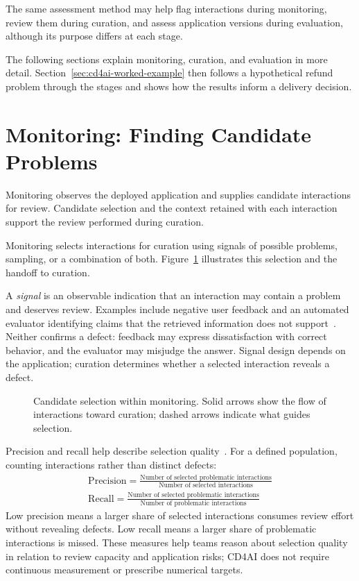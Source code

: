 The same assessment method may help flag interactions during monitoring, review
them during curation, and assess application versions during evaluation,
although its purpose differs at each stage.

The following sections explain monitoring, curation, and evaluation in more
detail. Section~\ref{sec:cd4ai-worked-example} then follows a hypothetical
refund problem through the stages and shows how the results inform a delivery
decision.

\section{Monitoring: Finding Candidate Problems}
\label{sec:cd4ai-monitoring}

Monitoring observes the deployed application and supplies candidate interactions
for review. Candidate selection and the context retained with each interaction
support the review performed during curation.

Monitoring selects interactions for curation using signals of possible
problems, sampling, or a combination of both. Figure~\ref{fig:cd4ai-candidate-selection}
illustrates this selection and the handoff to curation.

A \emph{signal} is an observable indication that an interaction may contain a
problem and deserves review. Examples include negative user feedback and an
automated evaluator identifying claims that the retrieved information does not
support~\parencite{MLflow:RetrievalGroundedness}. Neither confirms a defect:
feedback may express dissatisfaction with correct behavior, and the evaluator
may misjudge the answer. Signal design depends on the application; curation
determines whether a selected interaction reveals a defect.

\begin{figure}[htbp]
  \centering
  
  \caption{Candidate selection within monitoring. Solid arrows show the flow
    of interactions toward curation; dashed arrows indicate what guides
    selection.}
  \label{fig:cd4ai-candidate-selection}
\end{figure}

Precision and recall help describe selection
quality~\parencite[Section~8.3]{Manning:IR:2008}. For a defined population,
counting interactions rather than distinct defects:
\begin{gather*}
  \text{Precision} =
  \frac{\text{Number of selected problematic interactions}}
       {\text{Number of selected interactions}} \\[1ex]
  \text{Recall} =
  \frac{\text{Number of selected problematic interactions}}
       {\text{Number of problematic interactions}}
\end{gather*}
Low precision means a larger share of selected interactions consumes review
effort without revealing defects. Low recall means a larger share of problematic
interactions is missed. These measures help teams reason about selection
quality in relation to review capacity and application risks; CD4AI does not
require continuous measurement or prescribe numerical targets.

